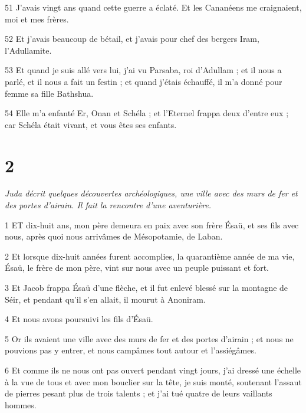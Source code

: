 \par 51 J'avais vingt ans quand cette guerre a éclaté. Et les Cananéens me craignaient, moi et mes frères.

\par 52 Et j'avais beaucoup de bétail, et j'avais pour chef des bergers Iram, l'Adullamite.

\par 53 Et quand je suis allé vers lui, j'ai vu Parsaba, roi d'Adullam ; et il nous a parlé, et il nous a fait un festin ; et quand j'étais échauffé, il m'a donné pour femme sa fille Bathshua.

\par 54 Elle m'a enfanté Er, Onan et Schéla ; et l'Eternel frappa deux d'entre eux ; car Schéla était vivant, et vous êtes ses enfants.

\chapter{2}

\par \textit{Juda décrit quelques découvertes archéologiques, une ville avec des murs de fer et des portes d'airain. Il fait la rencontre d'une aventurière.}

\par 1 ET dix-huit ans, mon père demeura en paix avec son frère Ésaü, et ses fils avec nous, après quoi nous arrivâmes de Mésopotamie, de Laban.

\par 2 Et lorsque dix-huit années furent accomplies, la quarantième année de ma vie, Ésaü, le frère de mon père, vint sur nous avec un peuple puissant et fort.

\par 3 Et Jacob frappa Ésaü d'une flèche, et il fut enlevé blessé sur la montagne de Séir, et pendant qu'il s'en allait, il mourut à Anoniram.

\par 4 Et nous avons poursuivi les fils d'Ésaü.

\par 5 Or ils avaient une ville avec des murs de fer et des portes d'airain ; et nous ne pouvions pas y entrer, et nous campâmes tout autour et l'assiégâmes.

\par 6 Et comme ils ne nous ont pas ouvert pendant vingt jours, j'ai dressé une échelle à la vue de tous et avec mon bouclier sur la tête, je suis monté, soutenant l'assaut de pierres pesant plus de trois talents ; et j'ai tué quatre de leurs vaillants hommes.

